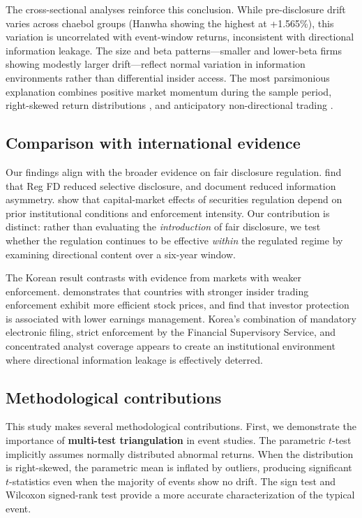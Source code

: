 \documentclass[review,authoryear]{elsarticle}
\begin{document}
The cross-sectional analyses reinforce this conclusion. While pre-disclosure drift varies across chaebol groups (Hanwha showing the highest at +1.565\%), this variation is uncorrelated with event-window returns, inconsistent with directional information leakage. The size and beta patterns---smaller and lower-beta firms showing modestly larger drift---reflect normal variation in information environments rather than differential insider access. The most parsimonious explanation combines positive market momentum during the sample period, right-skewed return distributions \citep{cont2001empirical}, and anticipatory non-directional trading \citep{chae2005trading}.

\subsection{Comparison with international evidence}

Our findings align with the broader evidence on fair disclosure regulation. \citet{bailey2003regulation} find that Reg FD reduced selective disclosure, and \citet{eleswarapu2004impact} document reduced information asymmetry. \citet{christensen2013capital} show that capital-market effects of securities regulation depend on prior institutional conditions and enforcement intensity. Our contribution is distinct: rather than evaluating the \textit{introduction} of fair disclosure, we test whether the regulation continues to be effective \textit{within} the regulated regime by examining directional content over a six-year window.

The Korean result contrasts with evidence from markets with weaker enforcement. \citet{beny2005impact} demonstrates that countries with stronger insider trading enforcement exhibit more efficient stock prices, and \citet{leuz2003earnings} find that investor protection is associated with lower earnings management. Korea's combination of mandatory electronic filing, strict enforcement by the Financial Supervisory Service, and concentrated analyst coverage appears to create an institutional environment where directional information leakage is effectively deterred.

\subsection{Methodological contributions}

This study makes several methodological contributions. First, we demonstrate the importance of \textbf{multi-test triangulation} in event studies. The parametric $t$-test implicitly assumes normally distributed abnormal returns. When the distribution is right-skewed, the parametric mean is inflated by outliers, producing significant $t$-statistics even when the majority of events show no drift. The sign test and Wilcoxon signed-rank test provide a more accurate characterization of the typical event.
\end{document}
